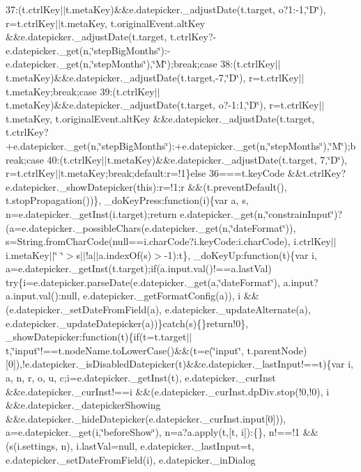 {{\begin{DoxyParamCaption}
37\+:(t.\+ctrl\+Key$\vert$$\vert$t.\+meta\+Key)\&\&e.\+datepicker.\+\_\+adjust\+Date(t.\+target, o?1\+:-\/1,\char`\"{}\+D\char`\"{}), r=t.\+ctrl\+Key$\vert$$\vert$t.\+meta\+Key, t.\+original\+Event.\+alt\+Key \&\&e.\+datepicker.\+\_\+adjust\+Date(t.\+target, t.\+ctrl\+Key?-\/e.\+datepicker.\+\_\+get(n,\char`\"{}step\+Big\+Months\char`\"{})\+:-\/e.\+datepicker.\+\_\+get(n,\char`\"{}step\+Months\char`\"{}),\char`\"{}\+M\char`\"{});break;case 38\+:(t.\+ctrl\+Key$\vert$$\vert$t.\+meta\+Key)\&\&e.\+datepicker.\+\_\+adjust\+Date(t.\+target,-\/7,\char`\"{}\+D\char`\"{}), r=t.\+ctrl\+Key$\vert$$\vert$t.\+meta\+Key;break;case 39\+:(t.\+ctrl\+Key$\vert$$\vert$t.\+meta\+Key)\&\&e.\+datepicker.\+\_\+adjust\+Date(t.\+target, o?-\/1\+:1,\char`\"{}\+D\char`\"{}), r=t.\+ctrl\+Key$\vert$$\vert$t.\+meta\+Key, t.\+original\+Event.\+alt\+Key \&\&e.\+datepicker.\+\_\+adjust\+Date(t.\+target, t.\+ctrl\+Key?+e.\+datepicker.\+\_\+get(n,\char`\"{}step\+Big\+Months\char`\"{})\+:+e.\+datepicker.\+\_\+get(n,\char`\"{}step\+Months\char`\"{}),\char`\"{}\+M\char`\"{});break;case 40\+:(t.\+ctrl\+Key$\vert$$\vert$t.\+meta\+Key)\&\&e.\+datepicker.\+\_\+adjust\+Date(t.\+target, 7,\char`\"{}\+D\char`\"{}), r=t.\+ctrl\+Key$\vert$$\vert$t.\+meta\+Key;break;default\+:r=!1\}else 36===t.\+key\+Code \&\&t.\+ctrl\+Key?e.\+datepicker.\+\_\+show\+Datepicker(this)\+:r=!1;r \&\&(t.\+prevent\+Default(), t.\+stop\+Propagation())\}, \+\_\+do\+Key\+Press\+:function(i)\{var a, s, n=e.\+datepicker.\+\_\+get\+Inst(i.\+target);return e.\+datepicker.\+\_\+get(n,\char`\"{}constrain\+Input\char`\"{})?(a=e.\+datepicker.\+\_\+possible\+Chars(e.\+datepicker.\+\_\+get(n,\char`\"{}date\+Format\char`\"{})), s=\+String.\+from\+Char\+Code(null==i.\+char\+Code?i.\+key\+Code\+:i.\+char\+Code), i.\+ctrl\+Key$\vert$$\vert$i.\+meta\+Key$\vert$$\vert$\char`\"{} \char`\"{}$>$s$\vert$$\vert$!a$\vert$$\vert$a.\+index\+Of(s)$>$-\/1)\+:t\}, \+\_\+do\+Key\+Up\+:function(t)\{var i, a=e.\+datepicker.\+\_\+get\+Inst(t.\+target);if(a.\+input.\+val()!==a.\+last\+Val) try\{i=e.\+datepicker.\+parse\+Date(e.\+datepicker.\+\_\+get(a,\char`\"{}date\+Format\char`\"{}), a.\+input?a.\+input.\+val()\+:null, e.\+datepicker.\+\_\+get\+Format\+Config(a)), i \&\&(e.\+datepicker.\+\_\+set\+Date\+From\+Field(a), e.\+datepicker.\+\_\+update\+Alternate(a), e.\+datepicker.\+\_\+update\+Datepicker(a))\}catch(s)\{\}return!0\}, \+\_\+show\+Datepicker\+:function(t)\{if(t=t.\+target$\vert$$\vert$t,\char`\"{}input\char`\"{}!==t.\+node\+Name.\+to\+Lower\+Case()\&\&(t=e(\char`\"{}input\char`\"{}, t.\+parent\+Node)\mbox{[}0\mbox{]}),!e.\+datepicker.\+\_\+is\+Disabled\+Datepicker(t)\&\&e.\+datepicker.\+\_\+last\+Input!==t)\{var i, a, n, r, o, u, c;i=e.\+datepicker.\+\_\+get\+Inst(t), e.\+datepicker.\+\_\+cur\+Inst \&\&e.\+datepicker.\+\_\+cur\+Inst!==i \&\&(e.\+datepicker.\+\_\+cur\+Inst.\+dp\+Div.\+stop(!0,!0), i \&\&e.\+datepicker.\+\_\+datepicker\+Showing \&\&e.\+datepicker.\+\_\+hide\+Datepicker(e.\+datepicker.\+\_\+cur\+Inst.\+input\mbox{[}0\mbox{]})), a=e.\+datepicker.\+\_\+get(i,\char`\"{}before\+Show\char`\"{}), n=a?a.\+apply(t,\mbox{[}t, i\mbox{]})\+:\{\}, n!==!1 \&\&(s(i.\+settings, n), i.\+last\+Val=null, e.\+datepicker.\+\_\+last\+Input=t, e.\+datepicker.\+\_\+set\+Date\+From\+Field(i), e.\+datepicker.\+\_\+in\+Dialog 
\end{DoxyParamCaption}}}
